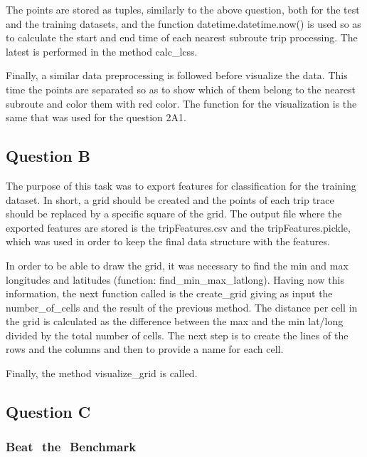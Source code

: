 \documentclass[12pt]{article}
\begin{document}
	The points are stored as tuples, similarly to the above question, both for the test and the training datasets, and the function datetime.datetime.now() is used so as to calculate the start and end time of each nearest subroute trip processing. The latest is performed in the method calc\_lcss.
	
	Finally, a similar data preprocessing is followed before visualize the data. This time the points are separated so as to show which of them belong to the nearest subroute and color them with red color. The function for the visualization is the same that was used for the question 2A1.
	
	\subsection{Question B}
	The purpose of this task was to export features for classification for the training dataset. In short, a grid should be created and the points of each trip trace should be replaced by a specific square of the grid. The output file where the exported features are stored is the tripFeatures.csv and the tripFeatures.pickle, which was used in order to keep the final data structure with the features.
	
	In order to be able to draw the grid, it was necessary to find the min and max longitudes and latitudes (function: find\_min\_max\_latlong). Having now this information, the next function called is the create\_grid giving as input the number\_of\_cells and the result of the previous method. The distance per cell in the grid is calculated as the difference between the max and the min lat/long divided by the total number of cells. The next step is to create the lines of the rows and the columns and then to provide a name for each cell.
	
	Finally, the method visualize\_grid is called.
	
	\subsection{Question C}
	
	
	\subsubsection{Beat ​ ​the ​ ​Benchmark}
	
	\newpage
	\begin{thebibliography}{30}
    \end{thebibliography}
	
\end{document}

